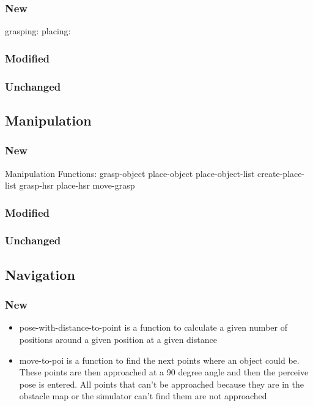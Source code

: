 \documentclass[main.tex]{subfiles}
\begin{document}
                \subsubsection{New}
                grasping:
                placing:
                \subsubsection{Modified}
                \subsubsection{Unchanged}
                
                \subsection{Manipulation}
                \subsubsection{New}
                Manipulation Functions:
                grasp-object
                place-object
                place-object-list
                create-place-list
                grasp-hsr
                place-hsr
                move-grasp
                \subsubsection{Modified}
                \subsubsection{Unchanged}
                
                \subsection{Navigation}
                \subsubsection{New}
                \begin{itemize}
 				 \item pose-with-distance-to-point is a function to calculate a given number of positions around a given position at a given distance
 				 \item move-to-poi is a function to find the next points where an object could be. These points are then approached at a 90 degree angle and then the perceive pose is entered. All points that can't be approached because they are in the obstacle map or the simulator can't find them are not approached
				\end{itemize}
\end{document}
